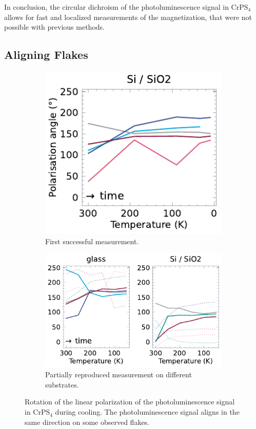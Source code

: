 \documentclass[
	twoside,
	parskip=half,
	a4paper,
]{scrbook}
\begin{document}
In conclusion, the circular dichroism of the photoluminescence signal in CrPS$_4$ allows for fast and localized measurements of the magnetization, that were not possible with previous methods.


\clearpage
\subsection{Aligning Flakes}
\label{sec:aligning flakes}
\begin{figure}
	\begin{subfigure}{2.5in}
		\includegraphics{../figures/2024-01-23 rotating pl.pdf}
		\caption{First successful measurement.}
		\label{fig:alignment first}
	\end{subfigure}
	\begin{subfigure}{3.5in}
		\includegraphics{../figures/2024-01-29 rotating pl.pdf}
		\caption{Partially reproduced measurement on different substrates.}
		\label{fig:alignment second}
	\end{subfigure}
	\caption{Rotation of the linear polarization of the photoluminescence signal in CrPS$_4$ during cooling. The photoluminescence signal aligns in the same direction on some observed flakes.}
	\label{fig:alignment}
\end{figure}
\end{document}

